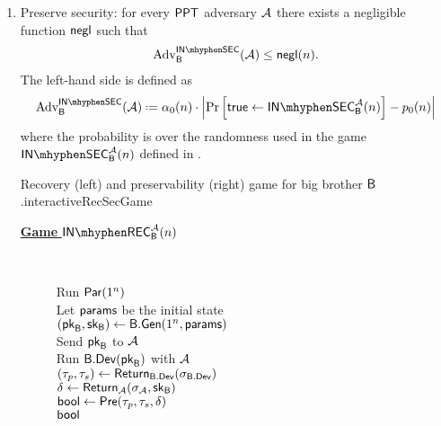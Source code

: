 \begin{defn}
\begin{enumerate}[1.]
\begin{boxfigTwo}{Distinguish game for weak/strong subversion.}{interactivedetectgame}
\begin{minipage}{0.45\textwidth}
\begin{description}
		If $b=0$: $\{$ Run $\dev$ with $\eve$ \\
	    $(\ptrans,\strans)\leftarrow\return_{\dev}(\st_{\dev}) \}$ \\
		If $b=1$:$\{$ Run $\bbdev(\bbpk)$ with $\eve$ \\
		$(\ptrans,\strans)\leftarrow\return_{\bbdev}(\st_{\bbdev}) \}$ \\
		\Ret $(\ptrans,\strans)$
		\smallskip
  	\end{description}
\end{minipage}
     \\ \hline 
	 $\eve$ is allowed to make $t$ queries to the oracle $\oracle$. &  $\user$ is allowed to make $t$ queries to the oracle $\oracle$ \\
	  Device and $\eve$ start with initial state $\params$ for each query. & Device and $\user$ start with initial state $\params$ for each query.
	 \\
\end{boxfigTwo}
		\item Preserve security: for every $\mathsf{PPT}$ adversary $\mathcal{A}$ there exists a negligible function $\operatorname{\mathsf{negl}}$ such that
		\begin{align*}
			\adv_{\bb}^{\insecgame}(\adve) \leq \negl(n).
		\end{align*}   
		The left-hand side is defined as
		\begin{align*}
			\adv_{\bb}^{\insecgame}(\adve) \defeq \secf(n)\cdot\left\vert \prob{\true\leftarrow\insecgame_{\bb}^{\adve}(n)} - \basep(n)\right\vert
		\end{align*}
		where the probability is over the randomness used in the game $\insecgame_{\bb}^{\adve}(n)$ defined in .
		\begin{boxfigTwo}{Recovery (left) and preservability (right) game for big brother $\mathsf{B}$.}{interactiveRecSecGame}
\begin{minipage}{0.45\textwidth}
    \smallskip
	\begin{description}
	\item[\underline{\textbf{Game} $\inrecgame_{\bb}^{\adve}(n)$}] ~
 	
 		Run $\operatorname{\mathsf{Par}}(1^n)$ \\
  		Let $\params$ be the initial state \\
 		$(\mathsf{pk}_{\mathsf{B}},\mathsf{sk}_{\mathsf{B}})\leftarrow \mathsf{B}.\mathsf{Gen}(1^n,\mathsf{params})$ \\
 		Send $\mathsf{pk}_{\mathsf{B}}$ to $\mathcal{A}$ \\
 		Run $\bbdev(\bbpk)$ with $\mathcal{A}$ \\
 		$(\tau_p,\tau_s)\leftarrow \operatorname{\mathsf{Return}}_{\mathsf{B}.\mathsf{Dev}}(\sigma_{\mathsf{B}.\mathsf{Dev}})$ \\	
 		$\delta\leftarrow \operatorname{\mathsf{Return}}_{\mathcal{A}}(\sigma_{\mathcal{A}},\mathsf{sk}_{\mathsf{B}})$ \\
 		$\mathsf{bool} \leftarrow \operatorname{\mathsf{Pre}}(\tau_p,\tau_s,\delta)$ \\
		\Ret $\mathsf{bool}$
		\smallskip
  	\end{description}
  	

\end{minipage}
\end{boxfigTwo}
\end{enumerate}
\end{defn}

